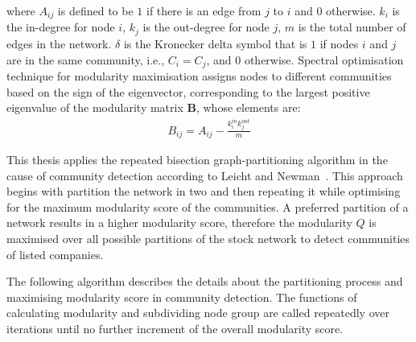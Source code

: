 where $A_{ij}$ is defined to be $1$ if there is an edge from $j$ to $i$ and $0$ otherwise. $k_i$ is the in-degree for node $i$, $k_j$ is the out-degree for node $j$, $m$ is the total number of edges in the network. $\delta$ is the Kronecker delta symbol that is $1$ if nodes $i$ and $j$ are in the same community, i.e., $C_i=C_j$, and $0$ otherwise. Spectral optimisation technique for modularity maximisation assigns nodes to different communities based on the sign of the eigenvector, corresponding to the largest positive eigenvalue of the modularity matrix \textbf{B}, whose elements are:
\begin{eqnarray}
B_{ij}=A_{ij}-\frac{k_i^{in}k_j^{out}}{m}
\end{eqnarray}

This thesis applies the repeated bisection graph-partitioning algorithm in the cause of community detection according to Leicht and Newman~\cite{PhysRevLett.100.118703}. This approach begins with partition the network in two and then repeating it while optimising for the maximum modularity score of the communities. A preferred partition of a network results in a higher modularity score, therefore the modularity $Q$ is maximised over all possible partitions of the stock network to detect communities of listed companies.

The following algorithm describes the details about the partitioning process and maximising modularity score in community detection. The functions of calculating modularity and subdividing node group are called repeatedly over iterations until no further increment of the overall modularity score.

